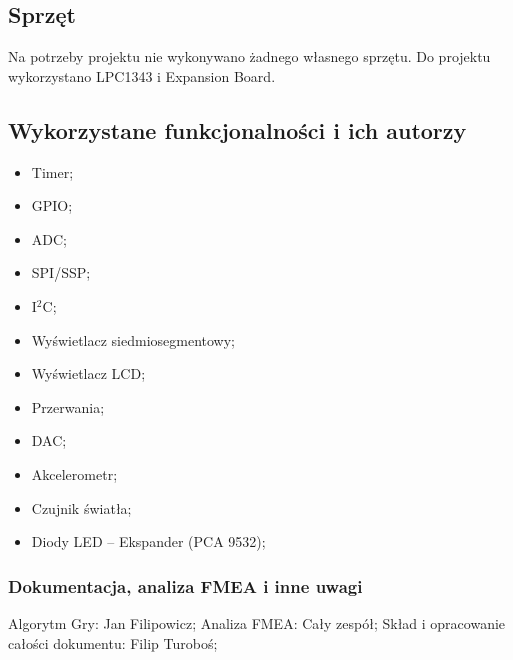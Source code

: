 \documentclass[a4paper,12pt,twoside]{article}
\theoremstyle{plain}
\theoremstyle{definition}
\theoremstyle{remark}
\begin{document}
\subsection{Sprzęt}
Na potrzeby projektu nie wykonywano żadnego własnego sprzętu.
Do projektu wykorzystano LPC1343 i Expansion Board.
\subsection{Wykorzystane funkcjonalności i ich autorzy}

\begin{itemize}
	\item Timer;\qquad\qquad\qquad\qquad{}
	\item GPIO;\qquad\qquad\qquad\qquad{}
	\item ADC; \qquad\qquad\qquad\qquad{}
	\item SPI/SSP;\qquad\qquad\qquad\qquad{}
	\item I$^2$C; \qquad\qquad\qquad\qquad{}
	\item Wyświetlacz siedmiosegmentowy; 
	\item Wyświetlacz LCD; \qquad\qquad\qquad{}
	\item Przerwania; \qquad\qquad\qquad\qquad{}
	\item DAC; \qquad\qquad\qquad\qquad\qquad\qquad{}
	\item Akcelerometr; \qquad\qquad\qquad\qquad{}
	\item Czujnik światła; \qquad\qquad\qquad\qquad{}
	\item Diody LED -- Ekspander (PCA 9532); \qquad\qquad\qquad\qquad{}
\end{itemize}
\subsubsection{Dokumentacja, analiza FMEA i inne uwagi}
Algorytm Gry: Jan Filipowicz;
Analiza FMEA: Cały zespół;
Skład i opracowanie całości dokumentu: Filip Turoboś;
\end{document}
